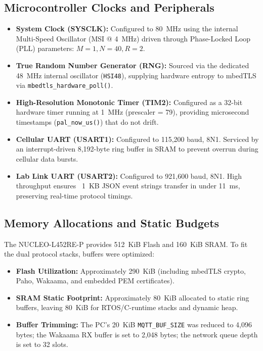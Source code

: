 \documentclass[11pt,a4paper]{article}
\newcommand{\code}[1]{\texttt{#1}}
\begin{document}
\subsection{Microcontroller Clocks and Peripherals}
\begin{itemize}
  \item \textbf{System Clock (SYSCLK):} Configured to 80~MHz using the internal Multi-Speed Oscillator (MSI @ 4~MHz) driven through Phase-Locked Loop (PLL) parameters: $M=1, N=40, R=2$.
  \item \textbf{True Random Number Generator (RNG):} Sourced via the dedicated 48~MHz internal oscillator (\code{HSI48}), supplying hardware entropy to mbedTLS via \code{mbedtls\_hardware\_poll()}.
  \item \textbf{High-Resolution Monotonic Timer (TIM2):} Configured as a 32-bit hardware timer running at 1~MHz (prescaler = 79), providing microsecond timestamps (\code{pal\_now\_us()}) that do not drift.
  \item \textbf{Cellular UART (USART1):} Configured to 115,200 baud, 8N1. Serviced by an interrupt-driven 8,192-byte ring buffer in SRAM to prevent overrun during cellular data bursts.
  \item \textbf{Lab Link UART (USART2):} Configured to 921,600 baud, 8N1. High throughput ensures ~1~KB JSON event strings transfer in under 11~ms, preserving real-time protocol timings.
\end{itemize}

\subsection{Memory Allocations and Static Budgets}
The NUCLEO-L452RE-P provides 512~KiB Flash and 160~KiB SRAM. To fit the dual protocol stacks, buffers were optimized:
\begin{itemize}
  \item \textbf{Flash Utilization:} Approximately 290~KiB (including mbedTLS crypto, Paho, Wakaama, and embedded PEM certificates).
  \item \textbf{SRAM Static Footprint:} Approximately 80~KiB allocated to static ring buffers, leaving 80~KiB for RTOS/C-runtime stacks and dynamic heap.
  \item \textbf{Buffer Trimming:} The PC's 20~KiB \code{MQTT\_BUF\_SIZE} was reduced to 4,096 bytes; the Wakaama RX buffer is set to 2,048 bytes; the network queue depth is set to 32 slots.
\end{itemize}
\end{document}
